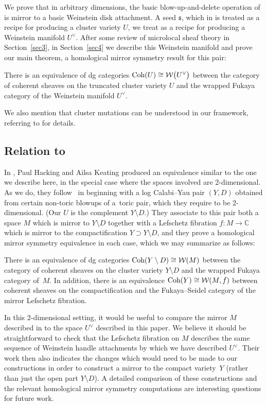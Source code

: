 \documentclass[pdftex]{sigma}%
\numberwithin{equation}{section}
\def\CC{\mathbb{C}}
\def\cW{\mathcal{W}}
\newcommand\frs{\mathfrak{s}}
\newcommand{\Coh}{\textup{Coh}}
\begin{document}
We prove that in arbitrary dimensions, the basic blow-up-and-delete operation of \cite{GHK2} is mirror to a basic Weinstein disk attachment.
A seed $\frs$, which in \cite{GHK2} is treated as a recipe for producing a cluster variety $U$, we treat as a recipe for producing a Weinstein manifold $U^\vee$.
After some review of microlocal sheaf theory in Section~\ref{sec3}, in Section~\ref{sec4} we describe this Weinstein manifold and prove our main theorem, a homological mirror symmetry result for this pair:
\begin{theorem*}
 There is an equivalence of dg categories $\Coh(U)\cong \cW\big(U^\vee\big)$ between the category of coherent sheaves on the truncated cluster variety $U$ and the wrapped Fukaya category of the Weinstein manifold $U^\vee$.
\end{theorem*}
We also mention that cluster mutations can be understood in our framework, referring to \cite{Nad-mut,PT,STW} for details.


\subsection[{Relation to [18]}]{Relation to \cite{HK20}}

In \cite{HK20}, Paul Hacking and Ailsa Keating produced an equivalence similar to the one we describe here, in the special case where the spaces involved are 2-dimensional. As we do, they follow~\cite{GHK2} in beginning with a log Calabi--Yau pair $(Y,D)$ obtained from certain non-toric blowups of a~toric pair, which they require to be 2-dimensional. (Our $U$ is the complement $Y \setminus D$.) They associate to this pair both a space $M$ which is mirror to $Y\setminus D$ together with a Lefschetz fibration $f\colon M\to \CC$ which is mirror to the compactification $Y\supset Y\setminus D$, and they prove a homological mirror symmetry equivalence in each case, which we may summarize as follows:
\begin{theorem*}[\cite{HK20}]
There is an equivalence of dg categories $\Coh(Y\setminus D)\cong \cW(M)$ between the category of coherent sheaves on the cluster variety $Y\setminus D$ and the wrapped Fukaya category of~$M$. In addition, there is an equivalence $\Coh(Y)\cong \cW(M,f)$ between coherent sheaves on the compactification and the Fukaya--Seidel category of the mirror Lefschetz fibration.
\end{theorem*}

In this 2-dimensional setting, it would be useful to compare the mirror $M$ described in \cite{HK20} to the space $U^\vee$ described in this paper. We believe it should be straightforward to check that the Lefschetz fibration on $M$ describes the same sequence of Weinstein handle attachments by which we have described $U^\vee$. Their work then also indicates the changes which would need to be made to our constructions in order to construct a mirror to the compact variety~$Y$ (rather than just the open part $Y\setminus D$). A detailed comparison of these constructions and the relevant homological mirror symmetry computations are interesting questions for future work.
\end{document}

